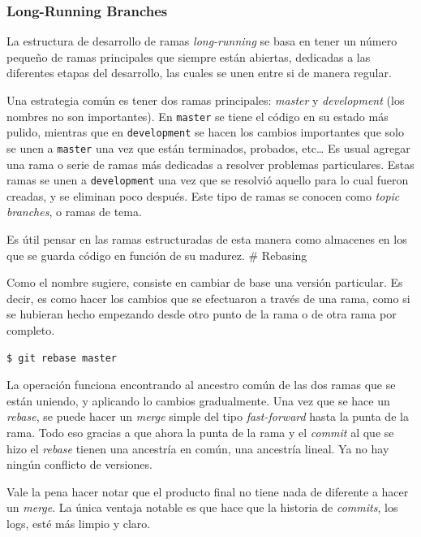 \documentclass[spanish, 12pt, a4paper]{article}
\begin{document}
\subsubsection{Long-Running Branches}

La estructura de desarrollo de ramas \emph{long-running} se basa en
tener un número pequeño de ramas principales que siempre están abiertas,
dedicadas a las diferentes etapas del desarrollo, las cuales se unen
entre si de manera regular.

Una estrategia común es tener dos ramas principales: \emph{master} y
\emph{development} (los nombres no son importantes). En
\passthrough{\lstinline!master!} se tiene el código en su estado más
pulido, mientras que en \passthrough{\lstinline!development!} se hacen
los cambios importantes que solo se unen a
\passthrough{\lstinline!master!} una vez que están terminados, probados,
etc\ldots{} Es usual agregar una rama o serie de ramas más dedicadas a
resolver problemas particulares. Estas ramas se unen a
\passthrough{\lstinline!development!} una vez que se resolvió aquello
para lo cual fueron creadas, y se eliminan poco después. Este tipo de
ramas se conocen como \emph{topic branches}, o ramas de tema.

Es útil pensar en las ramas estructuradas de esta manera como almacenes
en los que se guarda código en función de su madurez. \# Rebasing

Como el nombre sugiere, consiste en cambiar de base una versión
particular. Es decir, es como hacer los cambios que se efectuaron a
través de una rama, como si se hubieran hecho empezando desde otro punto
de la rama o de otra rama por completo.

\begin{lstlisting}
$ git rebase master
\end{lstlisting}

La operación funciona encontrando al ancestro común de las dos ramas que
se están uniendo, y aplicando lo cambios gradualmente. Una vez que se
hace un \emph{rebase}, se puede hacer un \emph{merge} simple del tipo
\emph{fast-forward} hasta la punta de la rama. Todo eso gracias a que
ahora la punta de la rama y el \emph{commit} al que se hizo el
\emph{rebase} tienen una ancestría en común, una ancestría lineal. Ya no
hay ningún conflicto de versiones.

Vale la pena hacer notar que el producto final no tiene nada de
diferente a hacer un \emph{merge}. La única ventaja notable es que hace
que la historia de \emph{commits}, los logs, esté más limpio y claro.
\end{document}
